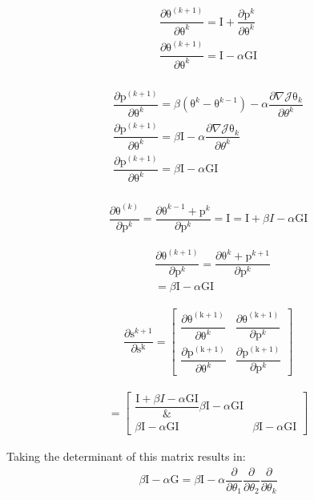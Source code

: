 \documentclass[12pt,letterpaper]{article} %
\newcommand{\bs}[1]{\bm{\mathrm{#1}}} %
\begin{document}
\begin{align*}
\dfrac{\partial \bs{\theta}^{(k+1)}}{\partial \bs{\theta}^k} =  \bs{I} + \dfrac{\partial \bs{p}^k}{\partial \bs{\theta}^k}\\
\dfrac{\partial \bs{\theta}^{(k+1)}}{\partial \bs{\theta}^k} =  \bs{I}  - \alpha\bs{G}\bs{I}\\
\end{align*}

\begin{align*}
\dfrac{\partial \bs{p}^{(k+1)}}{\partial \bs{\theta}^k} = \beta (\bs{\theta}^k-\bs{\theta}^{k-1}) - \alpha \dfrac{\partial \nabla \mathcal{J}\bs{\theta}_k}{\partial \theta^k}\\
\dfrac{\partial \bs{p}^{(k+1)}}{\partial \bs{\theta}^k} = \beta\bs{I} - \alpha \dfrac{\partial \nabla \mathcal{J}\bs{\theta}_k}{\partial \theta^k}\\
\dfrac{\partial \bs{p}^{(k+1)}}{\partial \bs{\theta}^k} = \beta\bs{I} - \alpha \bs{G}\bs{I}\\
\end{align*}

\begin{align*}
\dfrac{\partial \bs{\theta}^{(k)}}{\partial \bs{p}^k} =  \dfrac{\partial \bs{\theta}^{k-1} + \bs{p}^k}{\partial \bs{p}^k} = \bs{I}
 =  \bs{I} + \beta{I}  - \alpha\bs{G}\bs{I}
\end{align*}

\begin{align*}
&\dfrac{\partial \bs{\theta}^{(k+1)}}{\partial \bs{p}^k} =  \dfrac{\partial \bs{\theta}^{k} + \bs{p}^{k+1}}{\partial \bs{p}^k} \\
&= \beta\bs{I} - \alpha \bs{G}\bs{I}
\end{align*}

\begin{align*}
\dfrac{\partial \bs{s}^{k+1}}{\partial \bs{s^k}} = \begin{bmatrix} \dfrac{\partial\bs{\theta^{(k+1)}} }{\partial \bs{\theta}^k} & \dfrac{\partial\bs{\theta^{(k+1)}} }{\partial \bs{p}^k} \\ \dfrac{\partial\bs{p^{(k+1)}} }{\partial \bs{\theta}^k} & \dfrac{\partial\bs{p^{(k+1)}} }{\partial \bs{p}^k}\end{bmatrix}
\end{align*}

\begin{align*}
= \begin{bmatrix} \dfrac{\bs{I} + \beta{I} - \alpha\bs{G}\bs{I}} & \beta\bs{I} - \alpha \bs{G}\bs{I}\\ \beta\bs{I} - \alpha \bs{G}\bs{I} & \beta\bs{I} - \alpha \bs{G}\bs{I}\end{bmatrix}
\end{align*}

Taking the determinant of this matrix results in:
\begin{align*}
\beta\bs{I}-\alpha\bs{G}
=\beta\bs{I}-\alpha \dfrac{\partial}{\partial\theta_{1}}\dfrac{\partial}{\partial\theta_{2}}\dfrac{\partial}{\partial\theta_{k}}%
\end{align*}
\end{document}
